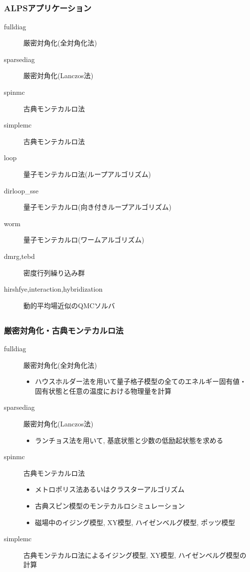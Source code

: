 \subsection*{\redb\whiteb\greenb}
\begin{frame}[t,fragile]
  \frametitle{ALPSアプリケーション}
  \begin{description}
  \item[fulldiag] 厳密対角化(全対角化法)
  \item[sparsediag] 厳密対角化(Lanczos法)
  \item[spinmc] 古典モンテカルロ法
  \item[simplemc] 古典モンテカルロ法
  \item[loop] 量子モンテカルロ法(ループアルゴリズム)
  \item[dirloop\_sse] 量子モンテカルロ(向き付きループアルゴリズム)
  \item[worm] 量子モンテカルロ(ワームアルゴリズム)
  \item[dmrg,tebd] 密度行列繰り込み群
  \item[hirshfye,interaction,hybridization] 動的平均場近似のQMCソルバ
  \end{description}
\end{frame}

\subsection*{\redb\whiteb\greenb}
\begin{frame}[t,fragile]
  \frametitle{厳密対角化・古典モンテカルロ法}
  \begin{description}
  \item[fulldiag] 厳密対角化(全対角化法)
    \begin{itemize}
    \item ハウスホルダー法を用いて量子格子模型の全てのエネルギー固有値・固有状態と任意の温度における物理量を計算
    \end{itemize}
  \item[sparsediag] 厳密対角化(Lanczos法)
    \begin{itemize}
    \item ランチョス法を用いて, 基底状態と少数の低励起状態を求める
    \end{itemize}
  \item[spinmc] 古典モンテカルロ法
    \begin{itemize}
      \item メトロポリス法あるいはクラスターアルゴリズム
      \item 古典スピン模型のモンテカルロシミュレーション
      \item 磁場中のイジング模型, XY模型, ハイゼンベルグ模型, ポッツ模型
    \end{itemize}
  \item[simplemc] 古典モンテカルロ法によるイジング模型, XY模型, ハイゼンベルグ模型の計算
  \end{description}
\end{frame}

